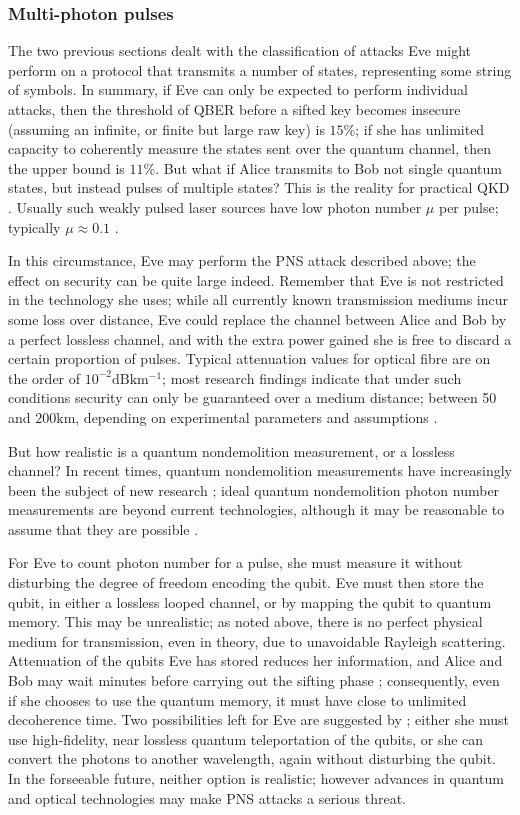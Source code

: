 \documentclass[paper=a4, fontsize=11pt]{scrartcl} %
\numberwithin{equation}{section} %
\numberwithin{figure}{section} %
\numberwithin{table}{section} %
\begin{document}
\subsubsection{Multi-photon pulses}
The two previous sections dealt with the classification of attacks Eve might perform on a protocol
that transmits a number of states, representing some string of symbols. In summary, if Eve can only be
expected to perform individual attacks, then the threshold of QBER before a sifted key becomes insecure
(assuming an infinite, or finite but large raw key) is $15\%$; if she has unlimited capacity to coherently measure
the states sent over the quantum channel, then the upper bound is $11\%$. But what if Alice transmits to Bob
not single quantum states, but instead pulses of multiple states? This is the reality for practical QKD \citep{huttner1995}.
Usually such weakly pulsed laser sources have low photon number $\mu$ per pulse; typically $\mu \approx 0.1$ \citep{reviewScariani}.

In this circumstance, Eve may perform the PNS attack described above; the effect on security can be quite large
indeed. Remember that Eve is not restricted in the technology she uses; while all currently known transmission
mediums incur some loss over distance, Eve could replace the channel between Alice and Bob by a perfect
lossless channel, and with the extra power gained she is free to discard a certain proportion of pulses. Typical
attenuation values for optical fibre are on the order of $10^{-2} \si{\dB \km^{-1}}$; most research findings indicate that
under such conditions security can only be guaranteed over a medium distance; between 50 and $200\si{\km}$, depending on experimental
parameters and assumptions \citep{perf2protocols, satellites, experimentalComparison}.

But how realistic is a quantum nondemolition measurement, or a lossless channel? In recent times,
quantum nondemolition measurements have increasingly been the subject of new research \citep{brassard2000};
ideal quantum nondemolition photon number measurements are beyond current technologies, although it may
be reasonable to assume that they are possible \citep{nogues1999}.

For Eve to count photon number for a pulse, she must measure it without disturbing the degree of
freedom encoding the qubit. Eve must then store the qubit, in either a lossless looped
channel, or by mapping the qubit to quantum memory. This may be unrealistic;
as noted above, there is no perfect physical medium
for transmission, even in theory, due to unavoidable Rayleigh scattering.
Attenuation of the qubits Eve has stored reduces her information, and Alice and Bob
may wait minutes before carrying out the sifting phase \citep{reviewScariani}; consequently, even if she chooses to
use the quantum memory, it must have close to unlimited decoherence time. Two possibilities left for Eve are suggested
by \citet{gisin2002}; either she must use high-fidelity, near lossless quantum teleportation of the qubits, or
she can convert the photons to another wavelength, again without disturbing the qubit. In the forseeable future,
neither option is realistic; however advances in quantum and optical technologies may make PNS attacks a serious threat.




\end{document}
